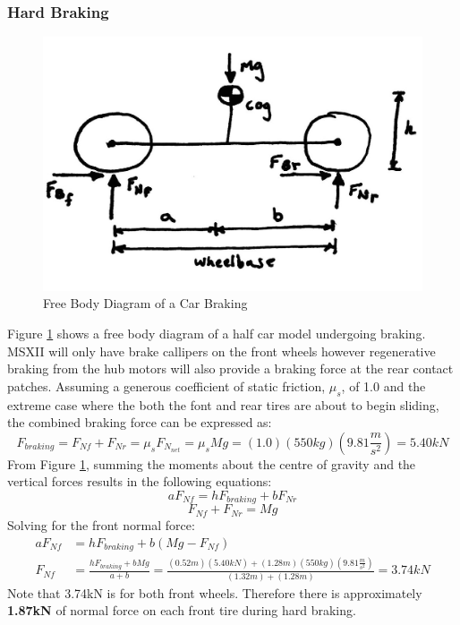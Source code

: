 \documentclass[12pt]{article}
\begin{document}
\subsubsection{Hard Braking}\begin{figure}[h!]
	\centering
	\includegraphics[width=.5\textwidth]{./LaTex/brakingFBD.jpg}
	\caption{Free Body Diagram of a Car Braking}
	\label{fig:barkingFBD}
\end{figure}
Figure \ref{fig:barkingFBD} shows a free body diagram of a half car model undergoing braking. MSXII will only have brake callipers on the front wheels however regenerative braking from the hub motors will also provide a braking force at the rear contact patches. Assuming a generous coefficient of static friction, $\mu _s$, of 1.0 and the extreme case where the both the font and rear tires are about to begin sliding, the combined braking force can be expressed as: 
\begin{equation}
	F_{braking} = F_{Nf} + F_{Nr} = \mu _s F_{N_{net}} =  \mu _s Mg = (1.0)(550kg)\left(9.81\frac{m}{s^2}\right) = 5.40kN
\end{equation}
From Figure \ref{fig:barkingFBD}, summing the moments about the centre of gravity and the vertical forces results in the following equations: 
\begin{equation}
	aF_{Nf} = hF_{braking} + bF_{Nr}
\end{equation}
\begin{equation}
	F_{Nf} + F_{Nr} = Mg
\end{equation}
Solving for the front normal force: 
\begin{equation}
\begin{split}
	aF_{Nf} &= hF_{braking} + b(Mg - F_{Nf})\\
	F_{Nf} &= \frac{hF_{braking} + bMg}{a+b} = \frac{(0.52m)(5.40kN)+(1.28m)(550kg)\left(9.81\frac{m}{s^2}\right)}{(1.32m)+(1.28m)} = 3.74kN
\end{split}
\end{equation}
Note that 3.74kN is for both front wheels. Therefore there is approximately \textbf{1.87kN} of normal force on each front tire during hard braking. 
\end{document}
